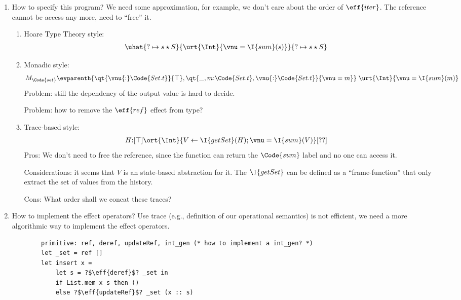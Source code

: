 \begin{example}[Iterators]
\begin{enumerate}
\begin{enumerate}
            Cons: What order shall we concat these traces? Or order is not important here (need abstraction)?

            Cons: the specification language need to be more powerful, even like a programming language.

            Cons: Need frame rules.
        \end{enumerate}
        \item How to specify this program? We need some approximation, for example, we don't care about the order of $\eff{iter}$. The reference cannot be access any more, need to ``free'' it.
        \begin{enumerate}
            \item Hoare Type Theory style:
            \begin{align*}
                & \uhat{? \mapsto s \star S}{\urt{\Int}{\vnu = \I{sum}(s)}}{? \mapsto s \star S}
            \end{align*}
            \item Monadic style:
            \begin{align*}
                M_{\Code{set}}\evparenth{\qt{\vnu{:}\Code{Set.t}}{\top}, \qt{\_,m{:}\Code{Set.t},\vnu{:}\Code{Set.t}}{\vnu = m}} \;\urt{\Int}{\vnu = \I{sum}(m)}
            \end{align*}
            Problem: still the dependency of the output value is hard to decide.

            Problem: how to remove the $\eff{ref}$ effect from type?
        \item Trace-based style:
        \begin{align*}
            & H{:}[\top]{\ort{\Int}{ V \leftarrow \I{getSet}(H); \vnu = \I{sum}(V) }}[??]
        \end{align*}
        Pros: We don't need to free the reference, since the function can return the $\Code{sum}$ label and no one can access it.

        Considerations: it seems that $V$ is an state-based abstraction for it. The $\I{getSet}$ can be defined as a ``frame-function'' that only extract the set of values from the history.

        Cons: What order shall we concat these traces? 
        \end{enumerate}
        \item How to implement the effect operators? Use trace (e.g., definition of our operational semantics) is not efficient, we need a more algorithmic way to implement the effect operators.
        \begin{verbatim}
        primitive: ref, deref, updateRef, int_gen (* how to implement a int_gen? *)
        let _set = ref []
        let insert x =
            let s = ?$\eff{deref}$? _set in
            if List.mem x s then ()
            else ?$\eff{updateRef}$? _set (x :: s)


\end{verbatim}
\end{enumerate}
\end{example}
